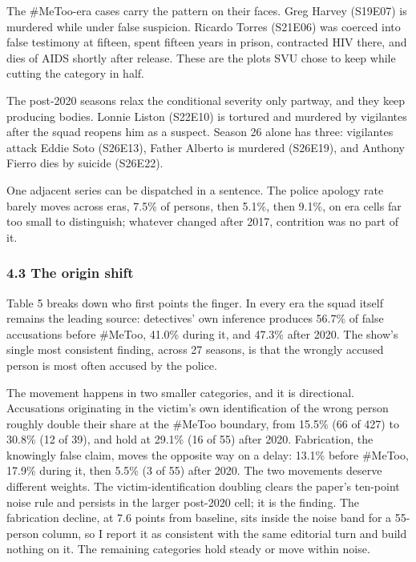 \documentclass[
]{article}
\begin{document}
The \#MeToo-era cases carry the pattern on their faces. Greg Harvey
(S19E07) is murdered while under false suspicion. Ricardo Torres
(S21E06) was coerced into false testimony at fifteen, spent fifteen
years in prison, contracted HIV there, and dies of AIDS shortly after
release. These are the plots SVU chose to keep while cutting the
category in half.

The post-2020 seasons relax the conditional severity only partway, and
they keep producing bodies. Lonnie Liston (S22E10) is tortured and
murdered by vigilantes after the squad reopens him as a suspect. Season
26 alone has three: vigilantes attack Eddie Soto (S26E13), Father
Alberto is murdered (S26E19), and Anthony Fierro dies by suicide
(S26E22).

One adjacent series can be dispatched in a sentence. The police apology
rate barely moves across eras, 7.5\% of persons, then 5.1\%, then 9.1\%,
on era cells far too small to distinguish; whatever changed after 2017,
contrition was no part of it.

\subsubsection{4.3 The origin shift}\label{the-origin-shift}

Table 5 breaks down who first points the finger. In every era the squad
itself remains the leading source: detectives' own inference produces
56.7\% of false accusations before \#MeToo, 41.0\% during it, and 47.3\%
after 2020. The show's single most consistent finding, across 27
seasons, is that the wrongly accused person is most often accused by the
police.

The movement happens in two smaller categories, and it is directional.
Accusations originating in the victim's own identification of the wrong
person roughly double their share at the \#MeToo boundary, from 15.5\%
(66 of 427) to 30.8\% (12 of 39), and hold at 29.1\% (16 of 55) after
2020. Fabrication, the knowingly false claim, moves the opposite way on
a delay: 13.1\% before \#MeToo, 17.9\% during it, then 5.5\% (3 of 55)
after 2020. The two movements deserve different weights. The
victim-identification doubling clears the paper's ten-point noise rule
and persists in the larger post-2020 cell; it is the finding. The
fabrication decline, at 7.6 points from baseline, sits inside the noise
band for a 55-person column, so I report it as consistent with the same
editorial turn and build nothing on it. The remaining categories hold
steady or move within noise.
\end{document}
